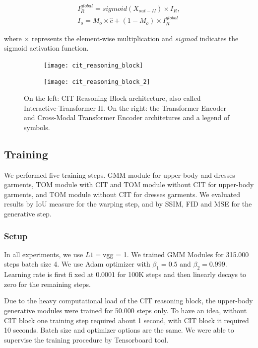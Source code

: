 \begin{equation}
  \begin{aligned}
    I_{R}^{global} = sigmoid(X_{out-II}) \times I_R, \\
I_o = M_o \times \hat{c} + (1 - M_o) \times I_{R}^{global}
  \end{aligned}
\end{equation}

where $\times$ represents the element-wise multiplication and $sigmod$ indicates the sigmoid activation function.

\FloatBarrier
\begin{figure}[h]
\centering
\begin{subfigure}{0.7\linewidth}
  \centering
  \texttt{[image: cit\_reasoning\_block]}
  \label{fig:sub1}
\end{subfigure}%
\begin{subfigure}{0.3\linewidth}
  \centering
  \texttt{[image: cit\_reasoning\_block\_2]}
  \label{fig:sub2}
\end{subfigure}
\caption{On the left: CIT Reasoning Block architecture, also called Interactive-Transformer II. On the right: the Transformer Encoder and Cross-Modal Transformer Encoder architetures and a legend of symbols.}
\label{fig:cit_architecture}
\end{figure}
\FloatBarrier

\subsection{Training}
We performed five training steps. GMM module for upper-body and dresses garments, TOM module with CIT and TOM module without CIT for upper-body garments, and TOM module without CIT for dresses garments. We evaluated results by IoU measure for the warping step, and by SSIM, FID and MSE for the generative step.
\subsubsection{Setup}
In all experiments, we use $L1 = $vgg = 1. We trained GMM Modules for 315.000 steps batch size 4. We use Adam optimizer with $\beta_1 = 0.5$ and $\beta_2 = 0.999$. Learning rate is first fixed at 0.0001 for 100K steps and then linearly decays to zero for the remaining steps.

Due to the heavy computational load of the CIT reasoning block, the upper-body generative modules were trained for 50.000 steps only. To have an idea, without CIT block one training step required about 1 second, with CIT block it required 10 seconds. Batch size and optimizer options are the same.
We were able to supervise the training procedure by Tensorboard tool.

